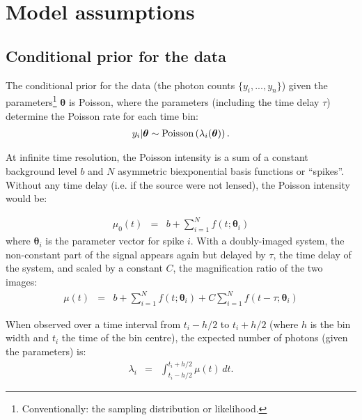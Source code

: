 \documentclass[a4paper, 11pt]{article}
\title{}
\author{}
\date{\today}
\begin{document}
\maketitle


\section{Model assumptions}

\subsection{Conditional prior for the data}
The conditional prior for the data (the photon counts $\{y_i, ..., y_n\}$)
given the parameters\footnote{Conventionally:
the sampling distribution or likelihood.} $\boldsymbol{\theta}$ is Poisson,
where the parameters (including the time delay $\tau$)
determine the Poisson rate for each time bin:
\begin{eqnarray}
y_i | \boldsymbol{\theta} \sim \textnormal{Poisson}
\left(
\lambda_i(\boldsymbol{\theta})
\right).
\end{eqnarray}

At infinite time resolution, the Poisson intensity is a sum of a constant
background level $b$ and $N$ asymmetric biexponential basis functions or
``spikes''. Without any time delay (i.e. if the source were not lensed),
the Poisson intensity would be:

\begin{eqnarray}
\mu_0(t) &=& b + \sum_{i=1}^N f(t; \boldsymbol{\theta}_i)
\end{eqnarray}
where $\boldsymbol{\theta}_i$ is the parameter vector for spike $i$.
With a doubly-imaged system, the non-constant part of the signal appears
again but delayed by $\tau$, the time delay of the system, and scaled by
a constant $C$, the magnification ratio of the two images:
\begin{eqnarray}
\mu(t) &=& b + \sum_{i=1}^N f(t; \boldsymbol{\theta}_i) +
C\sum_{i=1}^N f(t - \tau; \boldsymbol{\theta}_i)
\end{eqnarray}

When observed over a time interval from $t_i - h/2$ to $t_i + h/2$ (where
$h$ is the bin width and $t_i$ the time of the bin centre), the expected
number of photons (given the parameters) is:
\begin{eqnarray}
\lambda_i &=& \int_{t_i - h/2}^{t_i + h/2} \mu(t) \, dt.\label{eq:bin_integral}
\end{eqnarray}
\end{document}
